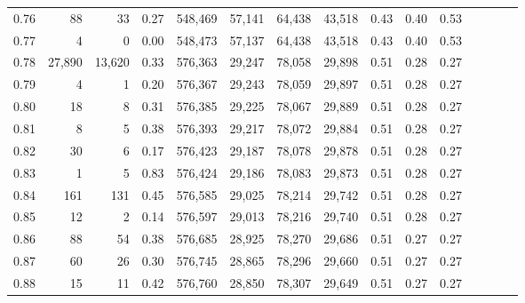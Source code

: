 \begin{tabular}{rrrcrrrrrrrrrrr}
0.76 &      88 &      33 &                                       0.27 &  548,469 &   57,141 &   64,438 &   43,518 &  0.43 &  0.40 &                         0.53 \\
0.77 &       4 &       0 &                                       0.00 &  548,473 &   57,137 &   64,438 &   43,518 &  0.43 &  0.40 &                         0.53 \\
0.78 &  27,890 &  13,620 &                                       0.33 &  576,363 &   29,247 &   78,058 &   29,898 &  0.51 &  0.28 &                         0.27 \\
0.79 &       4 &       1 &                                       0.20 &  576,367 &   29,243 &   78,059 &   29,897 &  0.51 &  0.28 &                         0.27 \\
0.80 &      18 &       8 &                                       0.31 &  576,385 &   29,225 &   78,067 &   29,889 &  0.51 &  0.28 &                         0.27 \\
0.81 &       8 &       5 &                                       0.38 &  576,393 &   29,217 &   78,072 &   29,884 &  0.51 &  0.28 &                         0.27 \\
0.82 &      30 &       6 &                                       0.17 &  576,423 &   29,187 &   78,078 &   29,878 &  0.51 &  0.28 &                         0.27 \\
0.83 &       1 &       5 &                                       0.83 &  576,424 &   29,186 &   78,083 &   29,873 &  0.51 &  0.28 &                         0.27 \\
0.84 &     161 &     131 &                                       0.45 &  576,585 &   29,025 &   78,214 &   29,742 &  0.51 &  0.28 &                         0.27 \\
0.85 &      12 &       2 &                                       0.14 &  576,597 &   29,013 &   78,216 &   29,740 &  0.51 &  0.28 &                         0.27 \\
0.86 &      88 &      54 &                                       0.38 &  576,685 &   28,925 &   78,270 &   29,686 &  0.51 &  0.27 &                         0.27 \\
0.87 &      60 &      26 &                                       0.30 &  576,745 &   28,865 &   78,296 &   29,660 &  0.51 &  0.27 &                         0.27 \\
0.88 &      15 &      11 &                                       0.42 &  576,760 &   28,850 &   78,307 &   29,649 &  0.51 &  0.27 &                         0.27 \\

\end{tabular}
